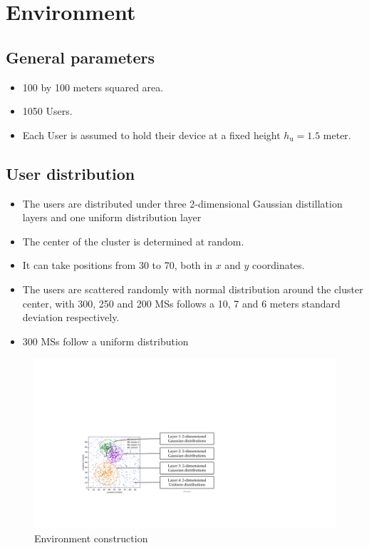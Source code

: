 \documentclass{IEEEtran}
\begin{document}
\section{Environment}
\subsection{General parameters}
\begin{itemize}
    \item 100 by 100 meters squared area.
    \item 1050 Users.
    \item Each User is assumed to hold their device at a fixed height ${h_\text{u} = 1.5}$ meter.
\end{itemize}
\subsection{User distribution}
\begin{itemize}
    \item The users are distributed under three 2-dimensional Gaussian distillation layers and one uniform distribution layer
    \item The center of the cluster is determined at random.
    \item It can take positions from 30 to 70, both in $x$ and $y$ coordinates.
    \item The users are scattered randomly with normal distribution around the cluster center, with 300, 250 and 200 MSs follows a 10, 7 and 6 meters standard deviation respectively.
    \item 300 MSs follow a uniform distribution
\end{itemize}
\begin{figure}[h]%
	\centering  %
	\includegraphics[width=1\linewidth]{figures/env_cons}  %
	\caption{Environment construction}  %
	\label{fig:env_cons}   %
\end{figure}
\end{document}

